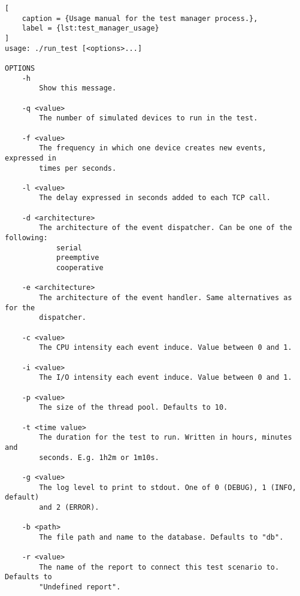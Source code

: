 \begin{lstlisting}[
    caption = {Usage manual for the test manager process.},
    label = {lst:test_manager_usage}
]
usage: ./run_test [<options>...]

OPTIONS
    -h
        Show this message.

    -q <value>
        The number of simulated devices to run in the test.

    -f <value>
        The frequency in which one device creates new events, expressed in
        times per seconds.

    -l <value>
        The delay expressed in seconds added to each TCP call.

    -d <architecture>
        The architecture of the event dispatcher. Can be one of the following:
            serial
            preemptive
            cooperative

    -e <architecture>
        The architecture of the event handler. Same alternatives as for the
        dispatcher.

    -c <value>
        The CPU intensity each event induce. Value between 0 and 1.

    -i <value>
        The I/O intensity each event induce. Value between 0 and 1.

    -p <value>
        The size of the thread pool. Defaults to 10.

    -t <time value>
        The duration for the test to run. Written in hours, minutes and
        seconds. E.g. 1h2m or 1m10s.

    -g <value>
        The log level to print to stdout. One of 0 (DEBUG), 1 (INFO, default)
        and 2 (ERROR).

    -b <path>
        The file path and name to the database. Defaults to "db".

    -r <value>
        The name of the report to connect this test scenario to. Defaults to
        "Undefined report".
\end{lstlisting}

